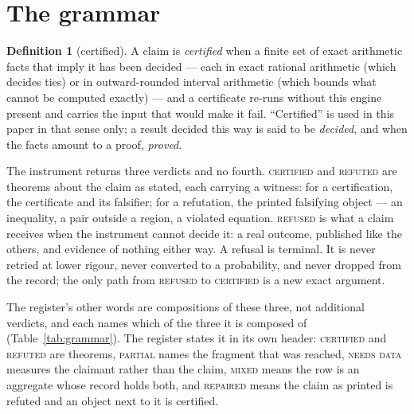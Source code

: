 \documentclass[11pt]{article}
\theoremstyle{plain}
\theoremstyle{definition}
\newtheorem{definition}{Definition}
\begin{document}
\section{The grammar}\label{sec:grammar}

\begin{definition}[certified]\label{def:certified}
A claim is \emph{certified} when a finite set of exact arithmetic facts that imply it has been decided --- each in exact rational arithmetic (which decides ties) or in outward-rounded interval arithmetic (which bounds what cannot be computed exactly) --- and a certificate re-runs without this engine present and carries the input that would make it fail. ``Certified'' is used in this paper in that sense only; a result decided this way is said to be \emph{decided}, and when the facts amount to a proof, \emph{proved}.
\end{definition}

The instrument returns three verdicts and no fourth. \textsc{certified} and \textsc{refuted} are theorems about the claim as stated, each carrying a witness: for a certification, the certificate and its falsifier; for a refutation, the printed falsifying object --- an inequality, a pair outside a region, a violated equation. \textsc{refused} is what a claim receives when the instrument cannot decide it: a real outcome, published like the others, and evidence of nothing either way. A refusal is terminal. It is never retried at lower rigour, never converted to a probability, and never dropped from the record; the only path from \textsc{refused} to \textsc{certified} is a new exact argument.

The register's other words are compositions of these three, not additional verdicts, and each names which of the three it is composed of (Table~\ref{tab:grammar}). The register states it in its own header: \textsc{certified} and \textsc{refuted} are theorems, \textsc{partial} names the fragment that was reached, \textsc{needs data} measures the claimant rather than the claim, \textsc{mixed} means the row is an aggregate whose record holds both, and \textsc{repaired} means the claim as printed is refuted and an object next to it is certified.
\end{document}
